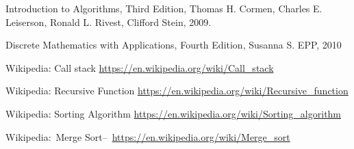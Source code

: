 \documentclass[12pt]{article}
\begin{document}
\pagebreak

\begin{thebibliography}{9}
	Introduction to Algorithms, Third Edition,
	Thomas H. Cormen, Charles E. Leiserson, Ronald L. Rivest, Clifford Stein,
	2009.
	
	
	Discrete Mathematics with Applications, Fourth Edition,
	Susanna S. EPP,
	2010
	
	Wikipedia: Call stack \url{https://en.wikipedia.org/wiki/Call_stack}
	
	Wikipedia: Recursive Function \url{https://en.wikipedia.org/wiki/Recursive_function}
	
	Wikipedia: Sorting Algorithm \url{https://en.wikipedia.org/wiki/Sorting_algorithm}
	
	Wikipedia:~Merge Sort–~\url{https://en.wikipedia.org/wiki/Merge_sort}
		
\end{thebibliography}
\end{document}

